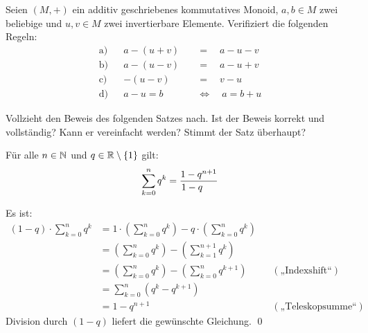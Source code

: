 \begin{aufg}
    Seien $(M,+)$ ein additiv geschriebenes kommutatives Monoid, $a,b\in M$ zwei beliebige und $u,v\in M$ zwei invertierbare Elemente. Verifiziert die folgenden Regeln:
    \begin{align*}
        \text{a)} && a-(u+v) \quad&=\quad a-u-v \\
        \text{b)} && a-(u-v) \quad&=\quad a-u+v \\
        \text{c)} && -(u-v) \quad&=\quad v-u \\
        \text{d)} && a-u=b \quad&\Leftrightarrow\quad a=b+u
    \end{align*}
\end{aufg}


\begin{comment}
\begin{aufg}[Kürzbarkeit]
    Sei $(M,*)$ ein Monoid. Ein Element $a\in M$ heißt \textbf{kürzbar}, wenn „Multiplikation mit $a$“ eine Äquivalenzumformung ist, d.h. wenn für alle $x,y\in M$ die beiden Äquivalenzen
    \begin{align*}
        a*x& =a*y \quad \leftrightarrow\quad x=y\\
        \text{und}\qquad x*a& =y*a \quad \leftrightarrow\quad x=y
    \end{align*}
    gelten.
    \begin{enumerate}
        \item Beweist, dass jedes invertierbare Element kürzbar ist.
        \item Ist ein kürzbares Element auch immer invertierbar?
    \end{enumerate}
\end{aufg}
\end{comment}


\begin{aufg} \label{aufg:geometrischereihe}
    Vollzieht den Beweis des folgenden Satzes nach. Ist der Beweis korrekt und vollständig? Kann er vereinfacht werden? Stimmt der Satz überhaupt?
    \begin{satz}
        Für alle $n\in \mathbb N$ und $q\in \mathbb R\setminus \{1\}$ gilt:
            \[ \sum_{k=0}^n q^k = \frac{1-q^{n+1}}{\kern-1.4em1-q} \]
    \end{satz}
    \begin{bew}
        Es ist:
        \begin{align*}
            (1-q) \cdot \sum_{k=0}^n q^k & = 1\cdot \left( \sum_{k=0}^n q^k \right) - q\cdot \left( \sum_{k=0}^n q^k \right) \\
            & = \left( \sum_{k=0}^n q^k \right) - \left( \sum_{k=1}^{n+1} q^{k} \right) \\
            & = \left( \sum_{k=0}^n q^k \right) - \left( \sum_{k=0}^{n} q^{k+1} \right) && (\text{„Indexshift“}) \\
            & = \sum_{k=0}^n (q^k - q^{k+1}) \\
            & = 1 - q^{n+1} && (\text{„Teleskopsumme“})
        \end{align*}
    Division durch $(1-q)$ liefert die gewünschte Gleichung. \qed
    \end{bew}
\end{aufg}

